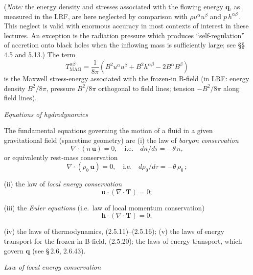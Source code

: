 (\emph{Note:} the energy density and stresses associated with the
flowing energy $\mathbf{q}$, as measured in the LRF, are here
neglected by comparison with $\rho u^\alpha u^\beta$ and
$p\, h^{\alpha\beta}$.  This neglect is valid with enormous accuracy in
most contexts of interest in these lectures.  An exception is the
radiation pressure which produces ``self-regulation'' of accretion onto
black holes when the inflowing mass is sufficiently large; see
\S\S\,4.5 and 5.13.)  The term
%
\begin{equation}
\tag{2.5.22}
T^{\alpha\beta}_{\text{MAG}}
= \frac{1}{8\pi}(B^2 u^\alpha u^\beta + B^2 h^{\alpha\beta}
  - 2B^\alpha B^\beta)
\end{equation}
%
is the Maxwell stress-energy associated with the frozen-in B-field (in
LRF: energy density $B^2/8\pi$, pressure $B^2/8\pi$ orthogonal to
field lines; tension $-B^2/8\pi$ along field lines).

\bigskip
\noindent
\emph{Equations of hydrodynamics}

\smallskip
\noindent
The fundamental equations governing the motion of a fluid in a given
gravitational field (spacetime geometry) are (i) the law of
\emph{baryon conservation}
%
\begin{equation}
\tag{2.5.23}
\nabla \cdot (n\,\mathbf{u}) = 0,
\quad\text{i.e.}\quad dn/d\tau = -\theta\, n,
\end{equation}
%
or equivalently rest-mass conservation
%
\begin{equation}
\tag{2.5.23$'$}
\nabla \cdot (\rho_0\, \mathbf{u}) = 0,
\quad\text{i.e.}\quad d\rho_0/d\tau = -\theta\, \rho_0\,;
\end{equation}

\noindent
(ii) the law of \emph{local energy conservation}
%
\begin{equation}
\tag{2.5.24}
\mathbf{u}\cdot(\nabla\cdot\mathbf{T}) = 0;
\end{equation}

\noindent
(iii) the \emph{Euler equations} (i.e.\ law of local momentum
conservation)
%
\begin{equation}
\tag{2.5.25}
\mathbf{h}\cdot(\nabla\cdot\mathbf{T}) = 0;
\end{equation}

\noindent
(iv) the laws of thermodynamics, (2.5.11)--(2.5.16); (v) the laws of
energy transport for the frozen-in B-field, (2.5.20); the laws of
energy transport, which govern $\mathbf{q}$ (see \S\,2.6, 2.6.43).

\bigskip
\noindent
\emph{Law of local energy conservation}

